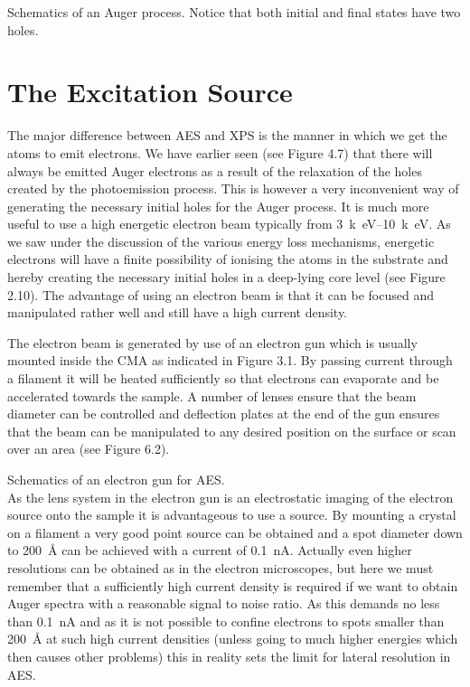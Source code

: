           \vspace*{14cm}

           Schematics of an  Auger  process.
          Notice that both initial and final states have two holes.\\

\section{The Excitation Source}\label{sec:aessource}
The major difference between AES and XPS is the manner in which we get the atoms to emit electrons. We have earlier seen (see Figure 4.7) that there will always be emitted Auger electrons as a result of the relaxation of the holes created by the photoemission process. This is however a very inconvenient way of generating the necessary initial holes for the Auger process. It is much more useful to use a high energetic electron beam typically from \SIrange{3}{10}{k\electronvolt}. As we saw under the discussion of the various energy loss mechanisms, energetic electrons will have a finite possibility of ionising the atoms in the substrate and hereby creating the necessary initial holes in a deep-lying core level (see Figure 2.10). The advantage of using an electron beam is that it can be focused and manipulated rather well and still have a high current density.
        
The electron beam is generated by use of an electron gun which is usually mounted inside the CMA as indicated in Figure 3.1. By passing current through a filament it will be heated sufficiently so that electrons can evaporate and be accelerated towards the sample. A number  of lenses ensure that the beam diameter can be controlled and deflection plates at the end of the gun ensures that the beam can be manipulated to any desired position on the surface or scan over an area (see Figure 6.2).\\

          \vspace{12cm}

           Schematics of an electron gun for
          AES.\\

As the lens system in the electron gun is an electrostatic imaging of the electron source onto the sample it is advantageous to use a  source. By mounting a  crystal on a filament a very good point source can be obtained and a spot diameter down to \SI{200}{\angstrom} can be achieved with a current of \SI{0.1}{nA}. Actually even higher resolutions can be obtained as in the  electron microscopes, but here we must remember that a sufficiently high current density is required if we want to obtain Auger spectra with a reasonable signal to noise ratio. As this demands no less than \SI{0.1}{nA} and as it is not possible to  confine electrons to spots smaller than \SI{200}{\angstrom} at such high  current  densities (unless going to much higher energies which then causes other problems) this in reality sets the limit for lateral resolution in AES.

